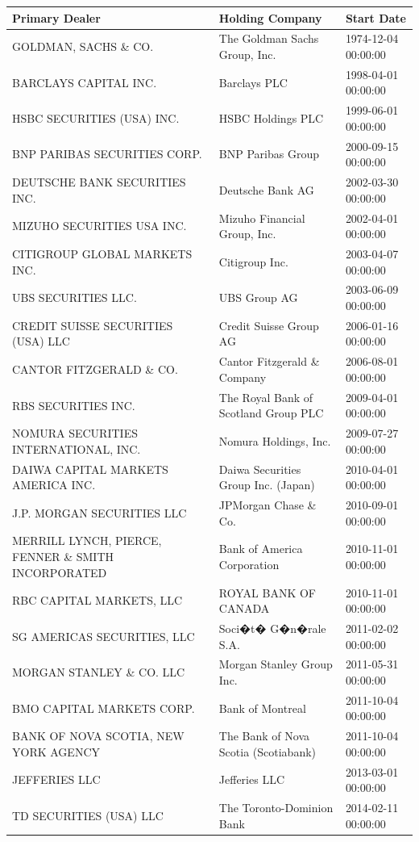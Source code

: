 \documentclass{article}
\begin{document}
\begin{tabular}{lll}
\toprule
Primary Dealer & Holding Company & Start Date \\
\midrule
GOLDMAN, SACHS \& CO.                & The Goldman Sachs Group, Inc. & 1974-12-04 00:00:00 \\
BARCLAYS CAPITAL INC.               & Barclays PLC & 1998-04-01 00:00:00 \\
HSBC SECURITIES (USA) INC.          & HSBC Holdings PLC & 1999-06-01 00:00:00 \\
BNP PARIBAS SECURITIES CORP.     & BNP Paribas Group & 2000-09-15 00:00:00 \\
DEUTSCHE BANK SECURITIES INC.    & Deutsche Bank AG & 2002-03-30 00:00:00 \\
MIZUHO SECURITIES USA INC.       & Mizuho Financial Group, Inc. & 2002-04-01 00:00:00 \\
CITIGROUP GLOBAL MARKETS INC.    & Citigroup Inc. & 2003-04-07 00:00:00 \\
UBS SECURITIES LLC.                 & UBS Group AG & 2003-06-09 00:00:00 \\
CREDIT SUISSE SECURITIES (USA) LLC     & Credit Suisse Group AG & 2006-01-16 00:00:00 \\
CANTOR FITZGERALD \& CO. & Cantor Fitzgerald \& Company & 2006-08-01 00:00:00 \\
RBS SECURITIES INC. & The Royal Bank of Scotland Group PLC & 2009-04-01 00:00:00 \\
NOMURA SECURITIES INTERNATIONAL, INC. & Nomura Holdings, Inc. & 2009-07-27 00:00:00 \\
DAIWA CAPITAL MARKETS AMERICA INC.   & Daiwa Securities Group Inc. (Japan) & 2010-04-01 00:00:00 \\
J.P. MORGAN SECURITIES LLC         & JPMorgan Chase \& Co. & 2010-09-01 00:00:00 \\
MERRILL LYNCH, PIERCE, FENNER \& SMITH INCORPORATED & Bank of America Corporation & 2010-11-01 00:00:00 \\
RBC CAPITAL MARKETS, LLC & ROYAL BANK OF CANADA & 2010-11-01 00:00:00 \\
SG AMERICAS SECURITIES, LLC & Soci�t� G�n�rale S.A. & 2011-02-02 00:00:00 \\
MORGAN STANLEY \& CO. LLC & Morgan Stanley Group Inc. & 2011-05-31 00:00:00 \\
BMO CAPITAL MARKETS CORP.  & Bank of Montreal & 2011-10-04 00:00:00 \\
BANK OF NOVA SCOTIA, NEW YORK AGENCY & The Bank of Nova Scotia (Scotiabank) & 2011-10-04 00:00:00 \\
JEFFERIES LLC & Jefferies LLC & 2013-03-01 00:00:00 \\
TD SECURITIES (USA) LLC & The Toronto-Dominion Bank & 2014-02-11 00:00:00 \\
\bottomrule
\end{tabular}
\end{document}
